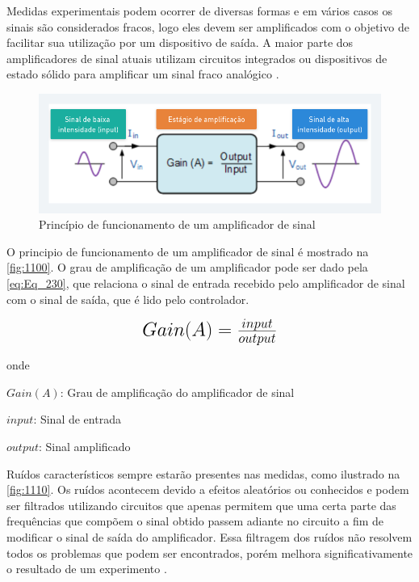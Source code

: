 Medidas experimentais podem ocorrer de diversas formas e em vários casos os sinais são considerados fracos, logo eles devem ser amplificados com o objetivo de facilitar sua
utilização por um dispositivo de saída.
A maior parte dos amplificadores de sinal atuais utilizam circuitos integrados ou dispositivos de estado sólido para amplificar um
sinal fraco analógico \autocite{Hollman2011}.

\begin{figure}[htb]
	\caption{\label{fig:1100} Princípio de funcionamento de um amplificador de sinal}
	\begin{center}
		\includegraphics[width=\textwidth]{pictures/1100.png}
	\end{center}
\end{figure}

O principio de funcionamento de um amplificador de sinal é mostrado na \autoref{fig:1100}.
O grau de amplificação de um amplificador pode ser dado pela \autoref{eq:Eq_230}, que relaciona o sinal de entrada recebido pelo amplificador de sinal com o sinal de saída, que é lido pelo controlador.

\begin{equation}\label{eq:Eq_230}%
\mbox{\fontsize{17.28}{21.6}\selectfont\( %
Gain(A) = \frac{input}{output}
\)} %
\end{equation}

onde

$Gain (A)$: Grau de amplificação do amplificador de sinal

$input$: Sinal de entrada

$output$: Sinal amplificado

\hfill

Ruídos característicos sempre estarão presentes nas medidas, como ilustrado na \autoref{fig:1110}.
Os ruídos acontecem devido a efeitos aleatórios ou conhecidos e podem ser filtrados utilizando circuitos que apenas permitem que uma certa parte das frequências que compõem o sinal obtido passem
adiante no circuito a fim de modificar o sinal de saída do amplificador.
Essa filtragem dos ruídos não resolvem todos os problemas que podem ser encontrados, porém melhora significativamente o resultado de um experimento \autocite{Hollman2011}.

